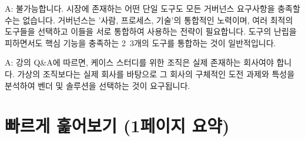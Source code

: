 \documentclass[11pt,a4paper]{article}
\theoremstyle{definition}
\begin{document}
\begin{tcolorbox}[mybox, title={Q: 거버넌스 도구 하나로 모든 것을 해결할 수 있나요?}]
A: 불가능합니다. 시장에 존재하는 어떤 단일 도구도 모든 거버넌스 요구사항을 충족할 수는 없습니다. 거버넌스는 '사람, 프로세스, 기술'의 통합적인 노력이며, 여러 최적의 도구들을 선택하고 이들을 서로 통합하여 사용하는 전략이 필요합니다. 도구의 난립을 피하면서도 핵심 기능을 충족하는 2~3개의 도구를 통합하는 것이 일반적입니다.
\end{tcolorbox}

\begin{tcolorbox}[mybox, title={Q: 케이스 스터디를 위한 조직은 가상이어도 되나요?}]
A: 강의 Q\&A에 따르면, 케이스 스터디를 위한 조직은 실제 존재하는 회사여야 합니다. 가상의 조직보다는 실제 회사를 바탕으로 그 회사의 구체적인 도전 과제와 특성을 분석하여 벤더 및 솔루션을 선택하는 것이 요구됩니다.
\end{tcolorbox}

\newpage
\section*{빠르게 훑어보기 (1페이지 요약)}
\end{document}
